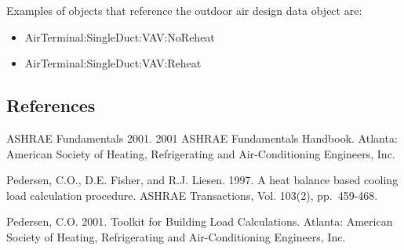 Examples of objects that reference the outdoor air design data object are:

\begin{itemize}
\item
  AirTerminal:SingleDuct:VAV:NoReheat
\item
  AirTerminal:SingleDuct:VAV:Reheat
\end{itemize}

\subsection{References}\label{references-058}

ASHRAE Fundamentals 2001. 2001 ASHRAE Fundamentals Handbook. Atlanta: American Society of Heating, Refrigerating and Air-Conditioning Engineers, Inc.

Pedersen, C.O., D.E. Fisher, and R.J. Liesen. 1997. A heat balance based cooling load calculation procedure. ASHRAE Transactions, Vol. 103(2), pp.~459-468.

Pedersen, C.O. 2001. Toolkit for Building Load Calculations. Atlanta: American Society of Heating, Refrigerating and Air-Conditioning Engineers, Inc.
